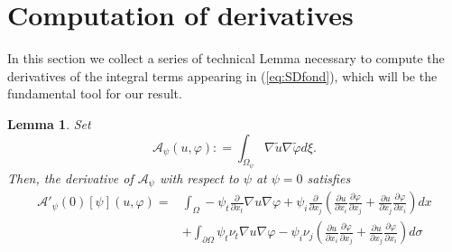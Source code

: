 \documentclass[a4paper,reqno,11pt,oneside]{amsart}
\theoremstyle{plain}
\theoremstyle{plain}
\newtheorem{lemma}[thm]{Lemma}
\theoremstyle{plain}
\theoremstyle{remark}
\begin{document}
\section{Computation of derivatives}\label{Sec:der}

In this section we collect a series of technical Lemma necessary to compute the derivatives of the integral terms appearing in (\ref{eq:SDfond}), which will be the fundamental tool for our result. 


\begin{lemma}\label{lem:Astorto} Set $$
\mathcal{A}_\psi(u,\varphi):
=\int_{\Omega_\psi} \nabla \tilde u\nabla \tilde \varphi d\xi.$$ 
Then, the derivative of $\mathcal{A}_\psi$ with respect to $\psi$ at $\psi=0$ satisfies
$$
\begin{aligned}
    \mathcal{A}'_\psi(0)[\psi](u,\varphi)=
&\int_\Omega-\psi_t \frac{\partial}{\partial x_t} \nabla u\nabla \varphi + \psi_i\frac{\partial }{ \partial x_j}\left(\frac{\partial u}{\partial x_i}\frac{\partial \varphi}{\partial x_j}+
\frac{\partial u}{\partial x_j}\frac{\partial \varphi}{\partial x_i}
\right) dx\\
&+\int_{\partial\Omega}\psi_t \nu_t \nabla u\nabla \varphi -
\psi_i \nu_j\left(\frac{\partial u}{\partial x_i}\frac{\partial \varphi}{\partial x_j}+\frac{\partial u}{\partial x_j}\frac{\partial \varphi}{\partial x_i}
\right) d\sigma
\end{aligned} $$
\end{lemma}
\end{document}
